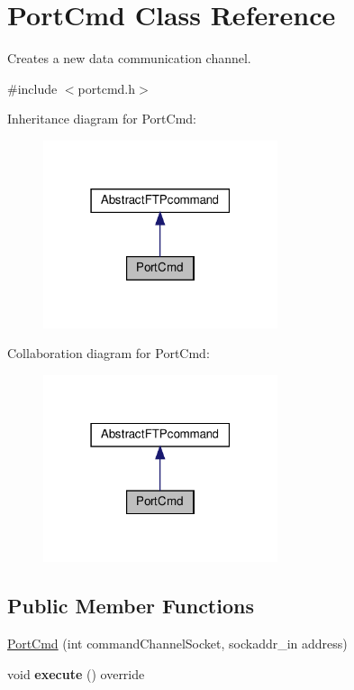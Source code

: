 \hypertarget{classPortCmd}{}\section{Port\+Cmd Class Reference}
\label{classPortCmd}


Creates a new data communication channel.  




{\ttfamily \#include $<$portcmd.\+h$>$}



Inheritance diagram for Port\+Cmd\+:\nopagebreak
\begin{figure}[H]
\begin{center}
\leavevmode
\includegraphics[width=195pt]{d7/de3/classPortCmd__inherit__graph}
\end{center}
\end{figure}


Collaboration diagram for Port\+Cmd\+:\nopagebreak
\begin{figure}[H]
\begin{center}
\leavevmode
\includegraphics[width=195pt]{d4/d7f/classPortCmd__coll__graph}
\end{center}
\end{figure}
\subsection*{Public Member Functions}
\begin{DoxyCompactItemize}
\item 
\hyperlink{classPortCmd_a08f48a9a7287459f6e8fae280a7b4557}{Port\+Cmd} (int command\+Channel\+Socket, sockaddr\+\_\+in address)
\item 
\mbox{\label{classPortCmd_ae562b3e358b8158babc5ef9bf8964be4}} 
void {\bfseries execute} () override
\end{DoxyCompactItemize}
